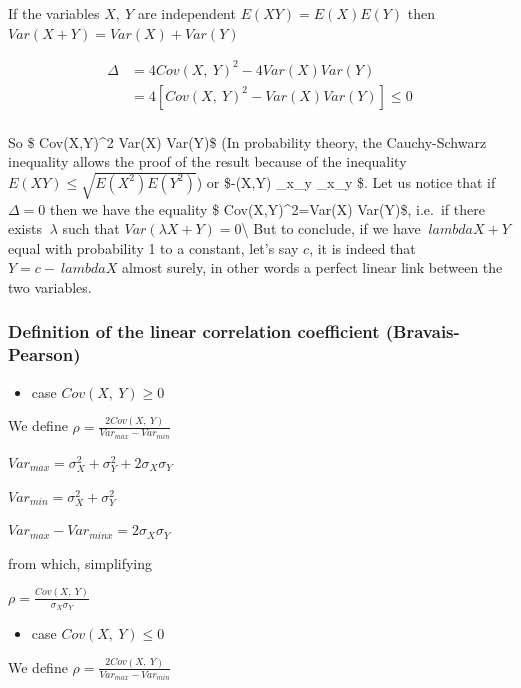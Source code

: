 \documentclass[
]{report}
\providecommand{\tightlist}{%
  \setlength{\itemsep}{0pt}\setlength{\parskip}{0pt}}
\begin{document}
If the variables \(X,~Y\) are independent \(E(XY) = E(X)E(Y)\) then
\(Var(X+Y) = Var(X) + Var(Y)\)

\begin{align*}
\Delta &= 4Cov(X,~Y)^2-4Var(X)Var(Y)\\
&=4[Cov(X,~Y)^2-Var(X)Var(Y)] \leq 0\\
\end{align*}

So \$ Cov(X,Y)\^{}2 \leq Var(X) Var(Y)\$ (In probability theory, the Cauchy-Schwarz inequality allows the proof of the result because of the inequality \(E(XY)\leq \sqrt{E(X^2)E(Y^2)}\))
or \$-(X,Y) \leq \sigma\_x\sigma\_y \leq \sigma\_x\sigma\_y \$.
Let us notice that if \(\Delta=0\) then we have the equality \$ Cov(X,Y)\^{}2=Var(X) Var(Y)\$, i.e.~if there exists \(~\lambda\) such that \(Var(\lambda X+Y)=0\)\textbackslash{}
But to conclude, if we have \(~lambda X+Y\) equal with probability 1 to a constant, let's say \(c\), it is indeed that \(Y = c -~lambda X\) almost surely, in other words a perfect linear link between the two variables.

\hypertarget{definition-of-the-linear-correlation-coefficient-bravais-pearson}{%
\subsubsection{Definition of the linear correlation coefficient (Bravais-Pearson)}\label{definition-of-the-linear-correlation-coefficient-bravais-pearson}}

\begin{itemize}
\tightlist
\item
  case \(Cov(X,~Y)\geq 0\)
\end{itemize}

We define
\(\rho = \frac{2Cov(X,~Y)}{Var_{max}-Var_{min}}\)

\(Var_{max} = \sigma_X^2+\sigma_Y^2+2\sigma_X\sigma_Y\)

\(Var_{min} = \sigma_X^2+\sigma_Y^2\)

\(Var_{max}-Var_{minx} = 2\sigma_X\sigma_Y\)

from which, simplifying

\(\rho = \frac{Cov(X,~Y)}{\sigma_X\sigma_Y}\)

\begin{itemize}
\tightlist
\item
  case \(Cov(X,~Y)\leq 0\)
\end{itemize}

We define
\(\rho = \frac{2Cov(X,~Y)}{Var_{max}-Var_{min}}\)
\end{document}

